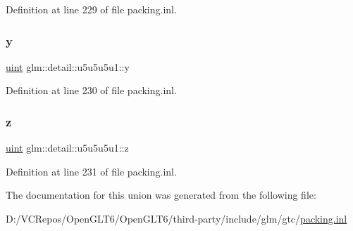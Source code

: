 Definition at line 229 of file packing.\+inl.

\mbox{\label{unionglm_1_1detail_1_1u5u5u5u1_a8dff950581d19ad8a5137dbfffc63a64}} 
\subsubsection{\texorpdfstring{y}{y}}
{\footnotesize\ttfamily \mbox{\hyperlink{group__core__precision_ga4fd29415871152bfb5abd588334147c8}{uint}} glm\+::detail\+::u5u5u5u1\+::y}



Definition at line 230 of file packing.\+inl.

\mbox{\label{unionglm_1_1detail_1_1u5u5u5u1_a110d067e1f37f6137c2806102c4508f6}} 
\subsubsection{\texorpdfstring{z}{z}}
{\footnotesize\ttfamily \mbox{\hyperlink{group__core__precision_ga4fd29415871152bfb5abd588334147c8}{uint}} glm\+::detail\+::u5u5u5u1\+::z}



Definition at line 231 of file packing.\+inl.



The documentation for this union was generated from the following file\+:\begin{DoxyCompactItemize}
\item 
D\+:/\+V\+C\+Repos/\+Open\+G\+L\+T6/\+Open\+G\+L\+T6/third-\/party/include/glm/gtc/\mbox{\hyperlink{packing_8inl}{packing.\+inl}}\end{DoxyCompactItemize}
